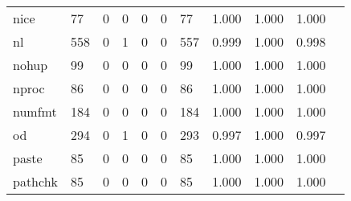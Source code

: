 \begin{longtable}{lp{1.10cm}p{1.10cm}p{1.10cm}p{1.10cm}p{1.10cm}p{1.10cm}p{1.10cm}p{1.10cm}p{1.10cm}p{1.10cm}}
nice      &                     77 &                                  0 &                                 0 &                                0 &                                 0 &                              77 &                          1.000 &                                 1.000 &                               1.000 \\
nl        &                    558 &                                  0 &                                 1 &                                0 &                                 0 &                             557 &                          0.999 &                                 1.000 &                               0.998 \\
nohup     &                     99 &                                  0 &                                 0 &                                0 &                                 0 &                              99 &                          1.000 &                                 1.000 &                               1.000 \\
nproc     &                     86 &                                  0 &                                 0 &                                0 &                                 0 &                              86 &                          1.000 &                                 1.000 &                               1.000 \\
numfmt    &                    184 &                                  0 &                                 0 &                                0 &                                 0 &                             184 &                          1.000 &                                 1.000 &                               1.000 \\
od        &                    294 &                                  0 &                                 1 &                                0 &                                 0 &                             293 &                          0.997 &                                 1.000 &                               0.997 \\
paste     &                     85 &                                  0 &                                 0 &                                0 &                                 0 &                              85 &                          1.000 &                                 1.000 &                               1.000 \\
pathchk   &                     85 &                                  0 &                                 0 &                                0 &                                 0 &                              85 &                          1.000 &                                 1.000 &                               1.000 \\

\end{longtable}
